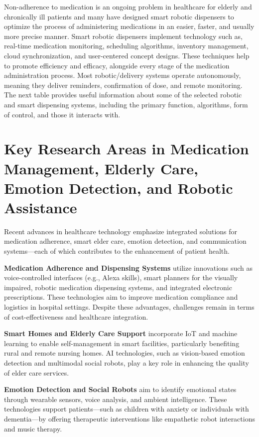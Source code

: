 Non-adherence to medication is an ongoing problem in healthcare for elderly and chronically ill patients and many have designed smart robotic dispensers to optimize the process of administering medications in an easier, faster, and usually more precise manner. Smart robotic dispensers implement technology such as, real-time medication monitoring, scheduling algorithms, inventory management, cloud synchronization, and user-centered concept designs. These techniques help to promote efficiency and efficacy, alongside every stage of the medication administration process. Most robotic/delivery systems operate autonomously, meaning they deliver reminders, confirmation of dose, and remote monitoring. The next table provides useful information about some of the selected robotic and smart dispensing systems, including the primary function, algorithms, form of control, and those it interacts with.

\section{Key Research Areas in Medication Management, Elderly Care, Emotion Detection, and Robotic Assistance}

Recent advances in healthcare technology emphasize integrated solutions for medication adherence, smart elder care, emotion detection, and communication systems—each of which contributes to the enhancement of patient health.

\textbf{Medication Adherence and Dispensing Systems} utilize innovations such as voice-controlled interfaces (e.g., Alexa skills), smart planners for the visually impaired, robotic medication dispensing systems, and integrated electronic prescriptions. These technologies aim to improve medication compliance and logistics in hospital settings. Despite these advantages, challenges remain in terms of cost-effectiveness and healthcare integration.

\textbf{Smart Homes and Elderly Care Support} incorporate IoT and machine learning to enable self-management in smart facilities, particularly benefiting rural and remote nursing homes. AI technologies, such as vision-based emotion detection and multimodal social robots, play a key role in enhancing the quality of elder care services.

\textbf{Emotion Detection and Social Robots} aim to identify emotional states through wearable sensors, voice analysis, and ambient intelligence. These technologies support patients—such as children with anxiety or individuals with dementia—by offering therapeutic interventions like empathetic robot interactions and music therapy.

